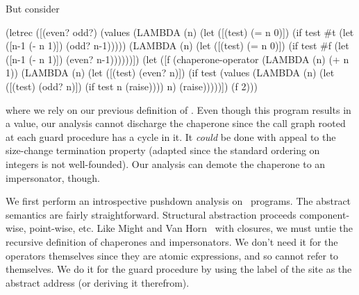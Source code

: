 \documentclass{sigplanconf}
\begin{document}
But consider
\begin{schemedisplay}
(letrec ([(even? odd?) (values (LAMBDA (n)
			         (let ([(test) (= n 0)])
			           (if test
			               #t
			               (let ([n-1 (- n 1)])
			                 (odd? n-1)))))
			       (LAMBDA (n)
			         (let ([(test) (= n 0)])
			           (if test
			               #f
			               (let ([n-1 (- n 1)])
			                 (even? n-1))))))])
  (let ([f (chaperone-operator (LAMBDA (n) (+ n 1))
                               (LAMBDA (n)
                                 (let ([(test) (even? n)])
                                   (if test
                                       (values (LAMBDA (n)
                                                 (let ([(test) (odd? n)])
                                                   (if test
                                                       n
                                                       (raise))))
                                               n)
                                       (raise)))))])
    (f 2)))
\end{schemedisplay}
where we rely on our previous definition of .
Even though this program results in a value, our analysis cannot discharge the chaperone since the call graph rooted at each guard procedure has a cycle in it.
It \emph{could} be done with appeal to the size-change termination property (adapted since the standard ordering on integers is not well-founded).
Our analysis can demote the chaperone to an impersonator, though.


We first perform an introspective pushdown analysis on \chapcalc\ programs.
The abstract semantics are fairly straightforward.
Structural abstraction proceeds component-wise, point-wise, etc.
Like Might and Van Horn~\cite{van2010abstracting} with closures, we must untie the recursive definition of chaperones and impersonators.
We don't need it for the operators themselves since they are atomic expressions, and so cannot refer to themselves.
We do it for the guard procedure by using the label of the site as the abstract address (or deriving it therefrom).
\end{document}
